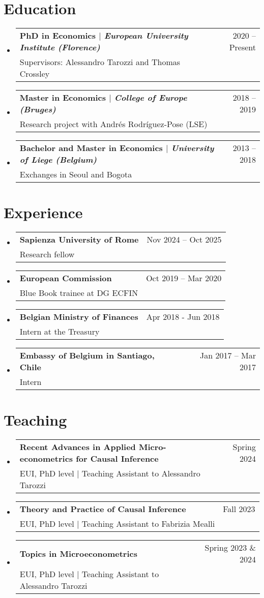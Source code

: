 \documentclass[12pt]{article}
\makeatletter
\newcommand{\CVItem}[1]{
  \item\small{
    {#1 \vspace{-2pt}}
  }
}
\newcommand{\CVSubheading}[4]{
  \vspace{-2pt}\item
    \begin{tabular*}{0.97\textwidth}[t]{l@{\extracolsep{\fill}}r}
      \textbf{#1} & #2 \\
      \small#3 & \small #4 \\
    \end{tabular*}\vspace{-7pt}
}
\newcommand{\CVSubHeadingListStart}{\begin{itemize}[leftmargin=0.5cm, label={}]}
\newcommand{\CVSubHeadingListEnd}{\end{itemize}}
\newcommand{\CVItemListStart}{\begin{itemize}}
\newcommand{\CVItemListEnd}{\end{itemize}\vspace{-5pt}}
\makeatother
\begin{document}
\section{Education}
  \CVSubHeadingListStart
    \CVSubheading
      {{PhD in Economics $|$ \emph{\small{European University Institute (Florence)}}}}{2020 -- Present}
      {Supervisors: Alessandro Tarozzi and Thomas Crossley}{}
    \CVSubheading
      {{Master in Economics $|$ \emph{\small{College of Europe (Bruges)}}}}{2018 -- 2019}
      {Research project with Andrés Rodríguez-Pose (LSE)}{}
    \CVSubheading
      {{Bachelor and Master in Economics $|$ \emph{\small{University of Liege (Belgium)}}}}{2013 -- 2018}
      {Exchanges in Seoul and Bogota}{}
  \CVSubHeadingListEnd
  



\section{Experience}
  \CVSubHeadingListStart
    \CVSubheading
      {Sapienza University of Rome}{Nov 2024 -- Oct 2025}
      {Research fellow}{}
    \CVSubheading
      {European Commission}{Oct 2019 -- Mar 2020}
      {Blue Book trainee at DG ECFIN}{}
    \CVSubheading
      {Belgian Ministry of Finances}{Apr 2018 - Jun 2018}
      {Intern at the Treasury}{}
    \CVSubheading
      {Embassy of Belgium in Santiago, Chile}{Jan 2017 -- Mar 2017}
      {Intern}{}
  \CVSubHeadingListEnd

 

\section{Teaching}
  \CVSubHeadingListStart
    \CVSubheading
      {{Recent Advances in Applied Micro-econometrics for Causal Inference}}{Spring 2024}
      {EUI, PhD level $|$ Teaching Assistant to Alessandro Tarozzi} {}
     \CVSubheading
      {{Theory and Practice of Causal Inference}}{Fall 2023}
      {EUI, PhD level $|$ Teaching Assistant to Fabrizia Mealli} {}
    \CVSubheading
      {{Topics in Microeconometrics}}{Spring 2023 \& 2024}
      {EUI, PhD level $|$ Teaching Assistant to Alessandro Tarozzi} {}
  \CVSubHeadingListEnd
\end{document}
